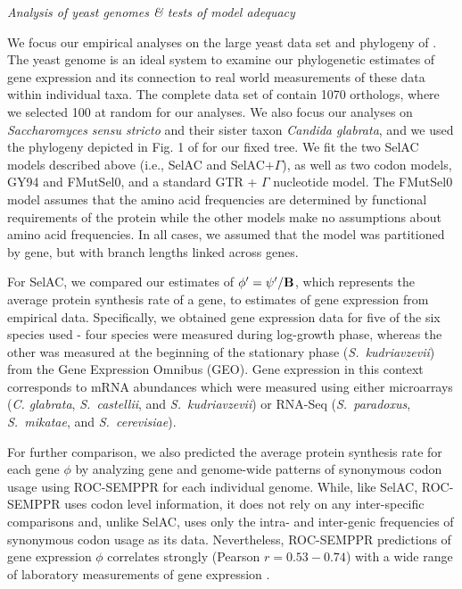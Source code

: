 \documentclass[12pt,letterpaper,fleqn]{article}
\renewcommand{\subsection}[1]{%
\bigskip
\begin{center}
\begin{large}
\normalfont\itshape #1
\end{large}
\end{center}}
\newcommand{\Func}{\ensuremath{\text{\textbf{B}}}\xspace}
\newcommand{\selac}{SelAC\xspace}
\newcommand{\selacplusgamma}{SelAC$+\Gamma$\xspace}
\newcommand{\phiprime}{\ensuremath{\phi^\prime}\xspace}
\newcommand{\psiprime}{\ensuremath{\psi^\prime}\xspace}
\begin{document}
\subsection{Analysis of yeast genomes \& tests of model adequacy} \label{sec:analysis}
We focus our empirical analyses on the large yeast data set and phylogeny of \citet{SalichosAndRokas2013}.
The yeast genome is an ideal system to examine our phylogenetic estimates of gene expression and its connection to real world measurements of these data within individual taxa.
The complete data set of \citet{SalichosAndRokas2013} contain 1070 orthologs, where we selected 100 at random for our analyses.
We also focus our analyses on \emph{Saccharomyces} \emph{sensu stricto} and their sister taxon \emph{Candida glabrata}, and we used the phylogeny depicted in Fig. 1 of \citet{SalichosAndRokas2013} for our fixed tree.
We fit the two \selac models described above (i.e., \selac and \selacplusgamma), as well as two codon models, GY94 and FMutSel0, and a standard GTR + $\Gamma$ nucleotide model.
The FMutSel0 model assumes that the amino acid frequencies are determined by functional requirements of the protein while the other models make no assumptions about amino acid frequencies.
In all cases, we assumed that the model was partitioned by gene, but with branch lengths linked across genes.

For \selac, we compared our estimates of $\phiprime = \psiprime/\Func$, which represents the average protein synthesis rate of a gene, to estimates of gene expression from empirical data.
Specifically, we obtained gene expression data for five of the six species used - four species were measured during log-growth phase, whereas the other was measured at the beginning of the stationary phase (\emph{S.~kudriavzevii}) from the Gene Expression Omnibus (GEO).
Gene expression in this context corresponds to mRNA abundances which were measured using either microarrays (\emph{C. glabrata}, \emph{S.~castellii}, and \emph{S.~kudriavzevii}) or RNA-Seq (\emph{S.~paradoxus}, \emph{S.~mikatae}, and \emph{S.~cerevisiae}).

For further comparison, we also predicted the average protein synthesis rate for each gene $\phi$ by analyzing gene and genome-wide patterns of synonymous codon usage using ROC-SEMPPR \citep{GilchristEtAl2015} for each individual genome.
While, like \selac, ROC-SEMPPR uses codon level information, it does not rely on any inter-specific comparisons and, unlike \selac, uses only the intra- and inter-genic frequencies of synonymous codon usage as its data.
Nevertheless, ROC-SEMPPR predictions of gene expression $\phi$ correlates strongly (Pearson $r= 0.53-0.74$) with a wide range of laboratory measurements of gene expression \citep{GilchristEtAl2015}.
\end{document}
